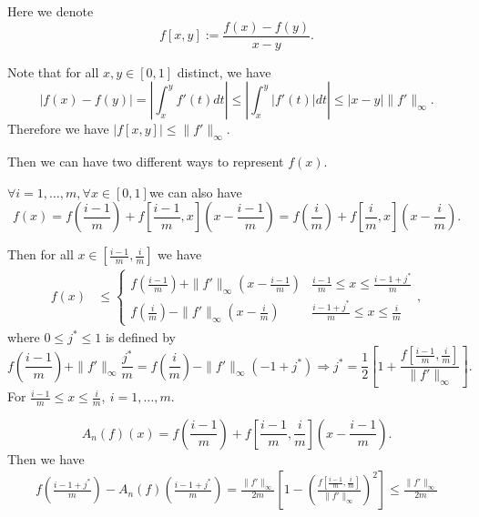 Here we denote
$$f[x,y]:=\frac{f(x)-f(y)}{x-y}.$$

 Note that for all $x,y \in [0,1]$ distinct, we have
 $$|f(x)-f(y)|=\left|\int_{x}^{y}f'(t)dt\right|\leq \left|\int_{x}^{y}\left|f'(t)\right|dt\right|
 \leq |x-y|\|f'\|_{\infty}.$$
 Therefore we have $|f[x,y]|\leq \|f'\|_{\infty}.$

Then we can have two different ways to represent $f(x).$

$\forall i=1,\ldots,m, \forall x \in [0,1]$we can also have
 $$f(x)=f\left(\frac{i-1}{m}\right)+f\left[\frac{i-1}{m},x\right]\left(x-\frac{i-1}{m}\right)=f\left(\frac{i}{m}\right)+f\left[\frac{i}{m},x\right]\left(x-\frac{i}{m}\right).$$



  Then for all $x \in \left[\frac{i-1}{m},\frac{i}{m}\right]$ we have
  \begin{align*}
  f(x)
  & \leq \left\{\begin{matrix}
  f\left(\frac{i-1}{m}\right)+\|f'\|_{\infty}\left(x-\frac{i-1}{m}\right) & \frac{i-1}{m} \leq x \leq \frac{i-1+j^{*}}{m} \\
  f\left(\frac{i}{m}\right)-\|f'\|_{\infty}\left(x-\frac{i}{m}\right) & \frac{i-1+j^{*}}{m} \leq x \leq \frac{i}{m}
  \end{matrix},\right.
  \end{align*}
where $0 \leq j^{*} \leq 1$ is defined by
$$f\left(\frac{i-1}{m}\right)+\|f'\|_{\infty}\frac{j^{*}}{m}=f\left(\frac{i}{m}\right)-\|f'\|_{\infty}\left(-1+j^{*}\right)
\Rightarrow j^{*}=\frac{1}{2}\left[1+\frac{f\left[\frac{i-1}{m},\frac{i}{m}\right]}{\|f'\|_{\infty}}\right].$$
For $\frac{i-1}{m} \leq x \leq \frac{i}{m}, \ i=1, \ldots, m.$

$$A_{n}(f)(x)=f\left(\frac{i-1}{m}\right)+f\left[\frac{i-1}{m},\frac{i}{m}\right]\left(x-\frac{i-1}{m}\right).$$
Then we have
\begin{align*}
f\left(\frac{i-1+j^{*}}{m}\right)-A_{n}(f)\left(\frac{i-1+j^{*}}{m}\right)
=\frac{\|f'\|_{\infty}}{2m}\left[1-\left(\frac{f\left[\frac{i-1}{m},\frac{i}{m}\right]}{\|f'\|_{\infty}}\right)^{2}\right]\leq \frac{\|f'\|_{\infty}}{2m}
\end{align*}

